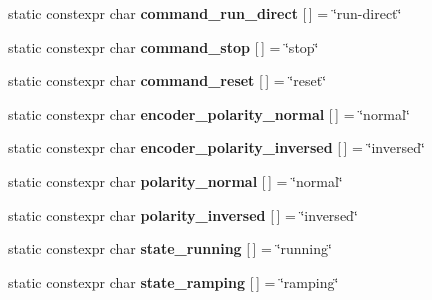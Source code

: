 \begin{DoxyCompactItemize}
static constexpr char {\bfseries command\+\_\+run\+\_\+direct} \mbox{[}$\,$\mbox{]} = \char`\"{}run-\/direct\char`\"{}
\item 
\mbox{\label{classev3dev_1_1motor_a82e63f22c9ad98f28dbe03808aa98e09}} 
static constexpr char {\bfseries command\+\_\+stop} \mbox{[}$\,$\mbox{]} = \char`\"{}stop\char`\"{}
\item 
\mbox{\label{classev3dev_1_1motor_af0e50dac54b593a29d873ce63fe7bb4f}} 
static constexpr char {\bfseries command\+\_\+reset} \mbox{[}$\,$\mbox{]} = \char`\"{}reset\char`\"{}
\item 
\mbox{\label{classev3dev_1_1motor_a470bdd49d9c8a05a89cf308f1c14bf07}} 
static constexpr char {\bfseries encoder\+\_\+polarity\+\_\+normal} \mbox{[}$\,$\mbox{]} = \char`\"{}normal\char`\"{}
\item 
\mbox{\label{classev3dev_1_1motor_a2a7b6b078d276ba48434f5e50f01499b}} 
static constexpr char {\bfseries encoder\+\_\+polarity\+\_\+inversed} \mbox{[}$\,$\mbox{]} = \char`\"{}inversed\char`\"{}
\item 
\mbox{\label{classev3dev_1_1motor_ac4210cd532fc96164f319abc7fe34b47}} 
static constexpr char {\bfseries polarity\+\_\+normal} \mbox{[}$\,$\mbox{]} = \char`\"{}normal\char`\"{}
\item 
\mbox{\label{classev3dev_1_1motor_ac11f9027121e9c3578ca816d9e50ae57}} 
static constexpr char {\bfseries polarity\+\_\+inversed} \mbox{[}$\,$\mbox{]} = \char`\"{}inversed\char`\"{}
\item 
\mbox{\label{classev3dev_1_1motor_a56ca6cf4493d6b92ebd6ecc81fa5a16e}} 
static constexpr char {\bfseries state\+\_\+running} \mbox{[}$\,$\mbox{]} = \char`\"{}running\char`\"{}
\item 
\mbox{\label{classev3dev_1_1motor_af73f9f55f338289292236acb837e6433}} 
static constexpr char {\bfseries state\+\_\+ramping} \mbox{[}$\,$\mbox{]} = \char`\"{}ramping\char`\"{}
\item 
\mbox{\label{classev3dev_1_1motor_a1e8491b870d0ed213382ed116557ba8f}} 

\end{DoxyCompactItemize}
